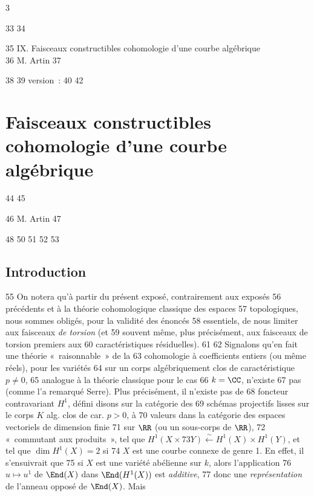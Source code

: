 3	\documentclass[10pt]{../fichiers-configuration-latex/smfart}
\begin{document}
    33	
    34	\begin{center}
    35	IX. Faisceaux constructibles cohomologie d'une courbe algébrique\\
    36	M. Artin 
    37	\end{center}
    38	
    39	version : \showgitstatus{}
    40		
    42		\chapter{Faisceaux constructibles cohomologie d'une courbe algébrique}
    44	%
    45	\begin{center}
    46	M. Artin 
    47	\end{center}
    48		
    50	\setcounter{pageoriginal}{0}
    51	
    52	\setcounter{section}{-1}
    53	\section{Introduction}	
    55	On notera qu'à partir du présent exposé, contrairement aux exposés
    56	précédents et à la théorie cohomologique classique des espaces
    57	topologiques, nous sommes obligés, pour la validité des énoncés
    58	essentiels, de nous limiter aux faisceaux \emph{de torsion} (et
    59	souvent même, plus précisément, aux faisceaux de torsion premiers aux
    60	caractéristiques résiduelles).
    61	
    62	Signalons qu'en fait une théorie « raisonnable »  de la
    63	cohomologie à coefficients entiers (ou même réels), pour les variétés
    64	sur un corps algébriquement clos de caractéristique $p\neq 0$,
    65	analogue à la théorie classique pour le cas
    66	$k=\CC$, n'existe
    67	pas (comme l'a remarqué Serre). Plus précisément, il n'existe pas de
    68	foncteur contravariant $H^1$, défini disons sur la catégorie des
    69	schémas projectifs lisses sur le corps $K$ alg. clos de car. $p> 0$, à
    70	valeurs dans la catégorie des espaces vectoriels de dimension finie
    71	sur $\RR$  (ou un sous-corps de $\RR$),
    72	« commutant aux produits », \ie tel que $H^1(X\times
    73	Y)\xleftarrow{\sim}H^1(X)\times H^1(Y)$, et tel que $\dim H^1(X)=2$ si
    74	$X$ est une courbe connexe de genre 1. En effet, il s'ensuivrait que
    75	si $X$ est une variété abélienne sur $k$, alors l'application
    76	$u\mapsto u^1$ de $\End(X)$ dans $\End(H^1(X))$ est \emph{additive},
    77	donc une \emph{représentation} de l'anneau opposé de $\End(X)$. Mais
\end{document}
